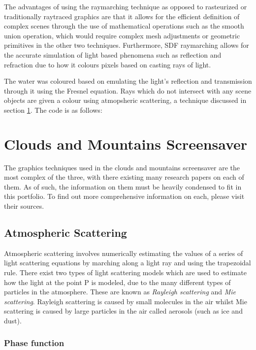 \documentclass[10pt, openany]{book}
\begin{document}
The advantages of using the raymarching technique as opposed to rasteurized or traditionally raytraced graphics are that it allows for the efficient definition of complex scenes through the use of mathematical operations such as the smooth union operation, which would require complex mesh adjustments or geometric primitives in the other two techniques. Furthermore, SDF raymarching allows for the accurate simulation of light based phenomena such as reflection and refraction due to how it colours pixels based on casting rays of light. 

The water was coloured based on emulating the light's reflection and transmission through it using the Fresnel equation. Rays which do not intersect with any scene objects are given a colour using atmopsheric scattering, a technique discussed in section \ref{sec:clouds}. The code is as follows: 

\section{Clouds and Mountains Screensaver}
\label{sec:clouds}

The graphics techniques used in the clouds and mountains screensaver are the most complex of the three, with there existing many research papers on each of them. As of such, the information on them must be heavily condensed to fit in this portfolio. To find out more comprehensive information on each, please visit their sources. 

\subsection{Atmospheric Scattering}

Atmospheric scattering involves numerically estimating the values of a series of light scattering equations by marching along a light ray and using the trapezoidal rule. There exist two types of light scattering models which are used to estimate how the light at the point P is modeled, due to the many different types of particles in the atmosphere. These are known as \textit{Rayleigh scattering} and \textit{Mie scattering}. Rayleigh scattering is caused by small molecules in the air whilst Mie scattering is caused by large particles in the air called aerosols (such as ice and dust). \citep{gpugems2}

\subsubsection{Phase function}
\end{document}
